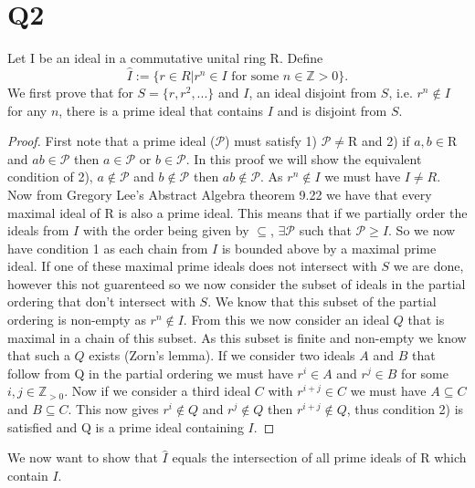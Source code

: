 \documentclass{article}
\theoremstyle{definition}
\begin{document}
\section*{Q2}
Let I be an ideal in a commutative unital ring R. Define
$$\hat{I}:= \{r \in R | r^n\in I \text{ for some } n\in\mathbb{Z}>0\}.$$
We first prove that for $S=\{r,r^2,...\}$ and $I$, an ideal disjoint from $S$, i.e. $r^n\notin I$ for any $n$, there is a prime ideal that contains $I$ and is disjoint from $S$.
\begin{proof}
First note that a prime ideal ($\mathcal{P}$) must satisfy 1) $\mathcal{P}\neq$R and 2) if $a,b\in$R and $ab\in\mathcal{P}$ then $a\in\mathcal{P}$ or $b\in\mathcal{P}$. In this proof we will show the equivalent condition of 2),  $a\notin\mathcal{P}$ and $b\notin\mathcal{P}$ then $ab\notin\mathcal{P}$. As $r^n\notin I$ we must have $I\neq R$. Now from Gregory Lee's Abstract Algebra theorem 9.22 we have that every maximal ideal of R is also a prime ideal. This means that if we partially order the ideals from $I$ with the order being given by $\subseteq$, $\exists\mathcal{P}$ such that $\mathcal{P}\geq I$. So we now have condition 1 as each chain from $I$ is bounded above by a maximal prime ideal. If one of these maximal prime ideals does not intersect with $S$ we are done, however this not guarenteed so we now consider the subset of ideals in the partial ordering that don't intersect with $S$. We know that this subset of the partial ordering is non-empty as $r^n\notin I$. From this we now consider an ideal $Q$ that is maximal in a chain of this subset. As this subset is finite and non-empty we know that such a $Q$ exists (Zorn's lemma). If we consider two ideals $A$ and $B$ that follow from Q in the partial ordering we must have $r^i\in A$ and $r^j\in B$ for some $i,j\in\mathbb{Z}_{>0}$. Now if we consider a third ideal $C$ with $r^{i+j}\in C$ we must have $A\subseteq C$ and $B\subseteq C$. This now gives $r^i\notin Q$ and $r^j\notin Q$ then $r^{i+j}\notin Q$, thus condition 2) is satisfied and Q is a prime ideal containing $I$.
\end{proof}
\noindent We now want to show that $\hat{I}$ equals the intersection of all prime ideals of R which contain $I$.
\end{document}
